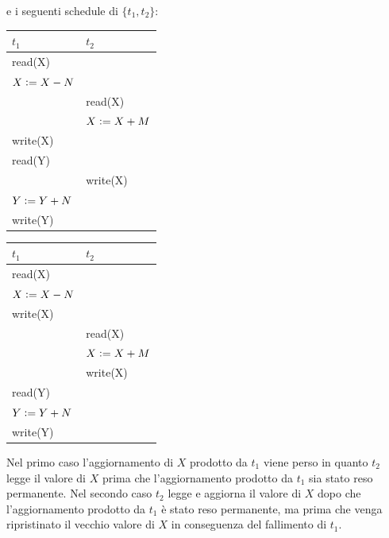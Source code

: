  e i seguenti schedule di $\{t_1 ,t_2\}$:

 \begin{multicols}{2}  
 \begin{tabular}{|l|l|}
 \hline
 $t_1$ & $t_2$\\
 \hline
   read(X) & \\ 
   $X\vcentcolon=X-N$ & \\ 
   & read(X)\\
   & $X\vcentcolon=X+M$\\ 
   write(X) &\\ 
   read(Y) &\\
   & write(X)\\
   $Y\vcentcolon=Y+N$ &\\
   write(Y)&\\
   \hline
  \end{tabular}
  
  \begin{tabular}{|l|l|}
   \hline
   $t_1$ & $t_2$\\
   \hline
   read(X) & \\ 
   $X\vcentcolon=X-N$ & \\ 
   write(X) &\\ 
   & read(X)\\
   & $X\vcentcolon=X+M$\\ 
   & write(X)\\
   read(Y) &\\
   $Y\vcentcolon=Y+N$ &\\
   write(Y)&\\
   \hline
  \end{tabular}
  
  
 \end{multicols}

Nel primo caso l'aggiornamento di $X$ prodotto da $t_1$ viene perso in quanto $t_2$ legge il valore di $X$
prima che l'aggiornamento prodotto da $t_1$ sia stato reso permanente. Nel secondo caso $t_2$ legge e
aggiorna il valore di $X$ dopo che l'aggiornamento prodotto da $t_1$ è stato reso permanente, ma prima
che venga ripristinato il vecchio valore di $X$ in conseguenza del fallimento di $t_1$.\\

